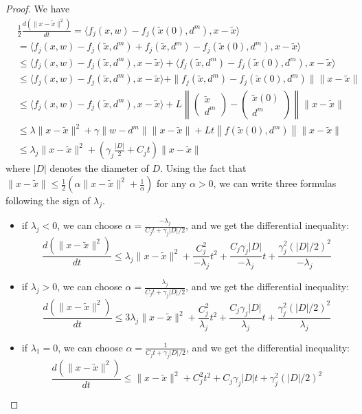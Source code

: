 \begin{proof}

We have
\begin{align*}
  &\frac{1}{2} \frac{d (\| x - \tilde x \|^2)}{dt}
   = \langle
  f_j(x,w) - f_j(\tilde x(0),d^m),x - \tilde x \rangle
\\
  & = \langle f_j(x,w) - f_j(\tilde x,d^m) + f_j(\tilde
  x,d^m) - f_j(\tilde x(0),d^m),x - \tilde x \rangle
\\
& \leq \langle f_j(x,w) - f_j(\tilde x,d^m), x - \tilde
  x \rangle + \langle f_j(\tilde x,d^m) - f_j(\tilde
  x(0),d^m),x - \tilde x \rangle
  \\
& \leq \langle f_j(x,w) - f_j(\tilde x,d^m), x - \tilde
  x \rangle + \| f_j(\tilde x,d^m) - f_j(\tilde x(0),d^m) \|
  \|x - \tilde x \|
  \\
  & \leq \langle f_j(x,w) - f_j(\tilde x,d^m), x - \tilde x \rangle + L \left\| \begin{pmatrix}
      \tilde x \\ d^m \end{pmatrix} - \begin{pmatrix} \tilde x(0)
      \\ d^m \end{pmatrix} \right\| \|x - \tilde x \|
  \\
  & \leq \lambda  \| x - \tilde x \|^2 + \gamma  \| w - d^m \| \| x - \tilde x \| + L t \left\| f(\tilde x(0),d^m)
\right\| \|x - \tilde x \|
\\
& \leq \lambda_j \| x - \tilde x \|^2 + \left( \gamma_j
  \frac{|D|}{2} + C_j t \right) \|x - \tilde x \|
\end{align*}
where $|D|$ denotes the diameter of $D$.  Using the fact that
$\|x - \tilde x \| \leq \frac{1}{2} (\alpha \|x - \tilde x
\|^2 + \frac{1}{\alpha}) $ for any $\alpha >0$, we can write three
formulas following the sign of $\lambda_j$.
\begin{itemize}
\item if $\lambda_j <0$, we can choose $\alpha = \frac{-
    \lambda_j}{C_j t + \gamma_j |D|/2}$, and we get the differential
  inequality:
$$\frac{d (\| x - \tilde x \|^2)}{dt}  \leq \lambda_j \|x - \tilde x \|^2  + \frac{C_j^2}{-\lambda_j} t^2 + \frac{C_j \gamma_j |D|}{-\lambda_j}t  + \frac{\gamma_j ^2 (|D|/2)^2}{-\lambda_j}$$
\item if $\lambda_j >0$, we can choose $\alpha = \frac{ \lambda_j
  }{C_j t + \gamma_j |D|/2}$, and we get the differential
  inequality:
$$\frac{d (\| x - \tilde x \|^2)}{dt}  \leq 3\lambda_j \|x - \tilde x \|^2  + \frac{C_j^2}{\lambda_j} t^2 + \frac{C_j \gamma_j |D|}{\lambda_j}t  + \frac{\gamma_j ^2 (|D|/2)^2}{\lambda_j}$$
\item if $\lambda_1 =0$, we can choose $\alpha = \frac{ 1 }{C_j t +
    \gamma_j |D|/2}$, and we get the differential inequality:
$$\frac{d (\| x - \tilde x \|^2)}{dt}  \leq \|x - \tilde x \|^2  + {C_j^2} t^2 + {C_j \gamma_j |D|}t  + {\gamma_j ^2 (|D|/2)^2}$$
\end{itemize}


\end{proof}

